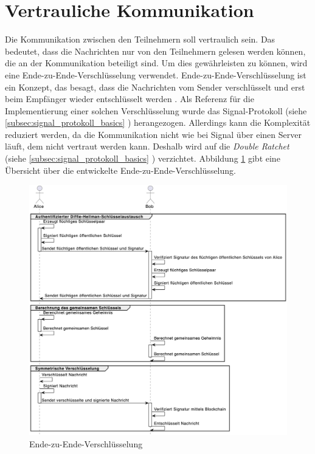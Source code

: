\section{Vertrauliche Kommunikation}
\label{subsec:vertrauliche_kommunikation}


Die Kommunikation zwischen den Teilnehmern soll vertraulich sein. Das bedeutet, dass die Nachrichten nur von den Teilnehmern gelesen werden können, die an der Kommunikation beteiligt sind. Um dies gewährleisten zu können, wird eine Ende-zu-Ende-Verschlüsselung verwendet. Ende-zu-Ende-Verschlüsselung ist ein Konzept, das besagt, dass die Nachrichten vom Sender verschlüsselt und erst beim Empfänger wieder entschlüsselt werden \parencite[S. 233-260]{Wong_KryptoPraxis}. Als Referenz für die Implementierung einer solchen Verschlüsselung wurde das Signal-Protokoll (siehe \ref{subsec:signal_protokoll_basics} \textit{}) herangezogen. Allerdings kann die Komplexität reduziert werden, da die Kommunikation nicht wie bei Signal über einen Server läuft, dem nicht vertraut werden kann. Deshalb wird auf die \textit{Double Ratchet} (siehe \ref{subsec:signal_protokoll_basics} \textit{}) verzichtet. Abbildung \ref{fig:ende_zu_ende} gibt eine Übersicht über die entwickelte Ende-zu-Ende-Verschlüsselung.

\begin{figure}[H]
    \centering
    \includegraphics[width=1\linewidth]{images/sec.jpg}
    \caption{Ende-zu-Ende-Verschlüsselung}
    \label{fig:ende_zu_ende}
\end{figure}

